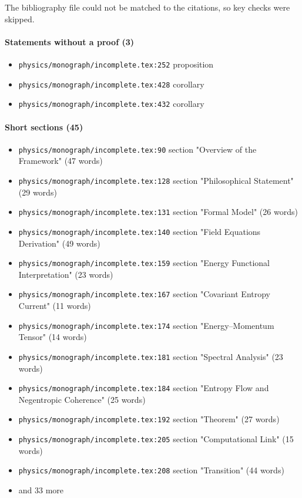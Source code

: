 \documentclass[11pt]{article}
\newcommand{\loc}[1]{{\small\color{muted}\texttt{#1}}}
\begin{document}
The bibliography file could not be matched to the citations, so key checks were skipped.

\paragraph{Statements without a proof (3)}
\begin{itemize}
\item \loc{physics/\allowbreak{}monograph/\allowbreak{}incomplete.tex:252} proposition
\item \loc{physics/\allowbreak{}monograph/\allowbreak{}incomplete.tex:428} corollary
\item \loc{physics/\allowbreak{}monograph/\allowbreak{}incomplete.tex:432} corollary
\end{itemize}
\paragraph{Short sections (45)}
\begin{itemize}
\item \loc{physics/\allowbreak{}monograph/\allowbreak{}incomplete.tex:90} section "Overview of the Framework" (47 words)
\item \loc{physics/\allowbreak{}monograph/\allowbreak{}incomplete.tex:128} section "Philosophical Statement" (29 words)
\item \loc{physics/\allowbreak{}monograph/\allowbreak{}incomplete.tex:131} section "Formal Model" (26 words)
\item \loc{physics/\allowbreak{}monograph/\allowbreak{}incomplete.tex:140} section "Field Equations Derivation" (49 words)
\item \loc{physics/\allowbreak{}monograph/\allowbreak{}incomplete.tex:159} section "Energy Functional Interpretation" (23 words)
\item \loc{physics/\allowbreak{}monograph/\allowbreak{}incomplete.tex:167} section "Covariant Entropy Current" (11 words)
\item \loc{physics/\allowbreak{}monograph/\allowbreak{}incomplete.tex:174} section "Energy--Momentum Tensor" (14 words)
\item \loc{physics/\allowbreak{}monograph/\allowbreak{}incomplete.tex:181} section "Spectral Analysis" (23 words)
\item \loc{physics/\allowbreak{}monograph/\allowbreak{}incomplete.tex:184} section "Entropy Flow and Negentropic Coherence" (25 words)
\item \loc{physics/\allowbreak{}monograph/\allowbreak{}incomplete.tex:192} section "Theorem" (27 words)
\item \loc{physics/\allowbreak{}monograph/\allowbreak{}incomplete.tex:205} section "Computational Link" (15 words)
\item \loc{physics/\allowbreak{}monograph/\allowbreak{}incomplete.tex:208} section "Transition" (44 words)
\item[] {\color{muted}\small and 33 more}
\end{itemize}
\end{document}
